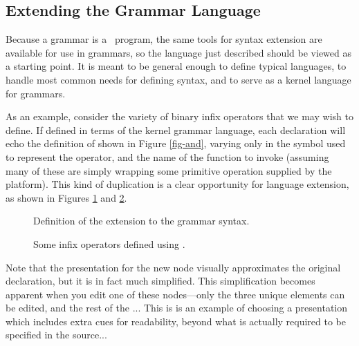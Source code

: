 \subsection{Extending the Grammar Language}
Because a grammar is a \Meta\ program, the same tools for syntax extension are available for use in grammars, so the  language just described should be viewed as a starting point. It is meant to be general enough to define typical languages, to handle most common needs for defining syntax, and to serve as a kernel language for grammars.

As an example, consider the variety of binary infix operators that we may wish to define. If defined in terms of the kernel grammar language, each declaration will echo the definition of  shown in Figure \ref{fig-and}, varying only in the symbol used to represent the operator, and the name of the function to invoke (assuming many of these are simply wrapping some primitive operation supplied by the platform). This kind of duplication is a clear opportunity for language extension, as shown in Figures \ref{fig-binary} and \ref{fig-binary-examples}.

\begin{figure}[ht]
  
  \caption{Definition of the  extension to the grammar syntax.}
  \label{fig-binary}
\end{figure}

\begin{figure}[ht]
  
  \caption{Some infix operators defined using .}
  \label{fig-binary-examples}
\end{figure}

Note that the presentation for the new node visually approximates the original declaration, but it is in fact much simplified. This simplification becomes apparent when you edit one of these nodes---only the three unique elements can be edited, and the rest of the ... This is is an example of choosing a presentation which includes extra cues for readability, beyond what is actually required to be specified in the source... 




